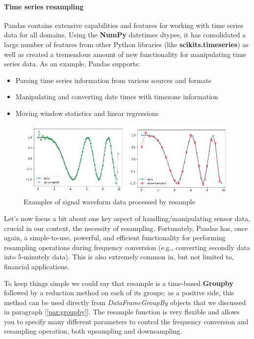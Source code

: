 \paragraph{Time series resampling}
Pandas contains extensive capabilities and features for working with time series data for all domains. Using the \textbf{NumPy} datetimes dtypes, it has consolidated a large number of features from other Python libraries (like \textbf{scikits.timeseries}) as well as created a tremendous amount of new functionality for manipulating time series data.
As an example, Pandas supports:
\begin{itemize}
    \item Parsing time series information from various sources and formats
    \item Manipulating and converting date times with timezone information
    \item Moving window statistics and linear regressions
\end{itemize}
\begin{figure}[ht]
    \centering
    \includegraphics[width=\textwidth]{content/chapter_3/images/up-down-sample.png}
    \caption{Examples of signal waveform data processed by resample}\label{fig:up and down sampling}
\end{figure}
Let's now focus a bit about one key aspect of handling/manipulating sensor data, crucial in our context, the necessity of resampling.
Fortunately, Pandas has, once again, a simple-to-use, powerful, and efficient functionality for performing resampling operations during frequency conversion (e.g., converting secondly data into 5-minutely data). This is also extremely common in, but not limited to, financial applications.

To keep things simple we could say that resample is a time-based \textbf{Groupby} followed by a reduction method on each of its groups; as a positive side, this method can be used directly from \textit{DataFrameGroupBy} objects that we discussed in paragraph [\ref{par:groupby}].
The resample function is very flexible and allows you to specify many different parameters to control the frequency conversion and resampling operation, both upsampling and downsampling.
